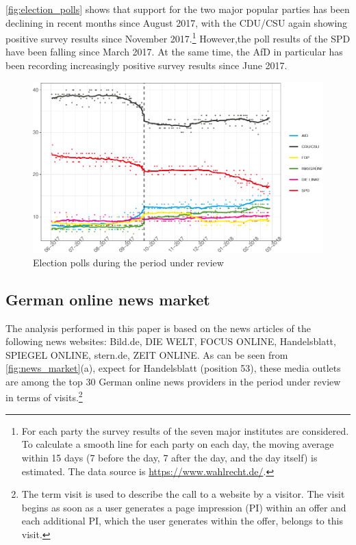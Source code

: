 \documentclass[
]{article}
\begin{document}
\autoref{fig:election_polls} shows that support for the two major
popular parties has been declining in recent months since August 2017,
with the CDU/CSU again showing positive survey results since November
2017.\footnote{For each party the survey results of the seven major
  institutes are considered. To calculate a smooth line for each party
  on each day, the moving average within 15 days (7 before the day, 7
  after the day, and the day itself) is estimated. The data source is
  \url{https://www.wahlrecht.de/}.} However,the poll results of the SPD
have been falling since March 2017. At the same time, the AfD in
particular has been recording increasingly positive survey results since
June 2017.

\begin{figure}

{\centering \includegraphics[width=0.5\linewidth]{main_text_files/figure-latex/election polls-1} 

}

\caption{Election polls during the period under review \label{fig:election_polls}}\label{fig:election polls}
\end{figure}

\hypertarget{german-online-news-market}{%
\subsection{German online news market}\label{german-online-news-market}}

The analysis performed in this paper is based on the news articles of
the following news websites: Bild.de, DIE WELT, FOCUS ONLINE,
Handelsblatt, SPIEGEL ONLINE, stern.de, ZEIT ONLINE. As can be seen from
\autoref{fig:news_market}(a), expect for Handelsblatt (position 53),
these media outlets are among the top 30 German online news providers in
the period under review in terms of visits.\footnote{The term visit is
  used to describe the call to a website by a visitor. The visit begins
  as soon as a user generates a page impression (PI) within an offer and
  each additional PI, which the user generates within the offer, belongs
  to this visit.}
\end{document}
